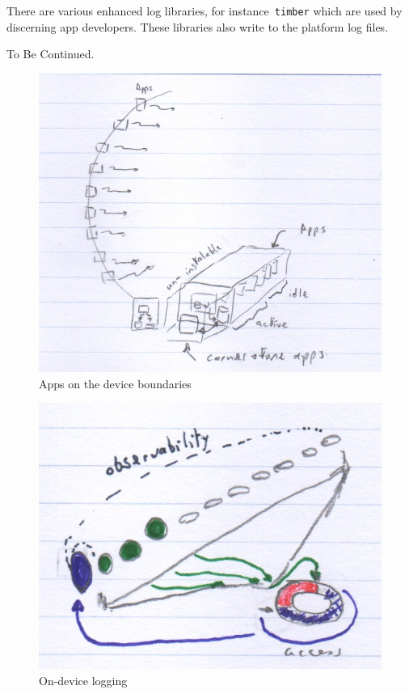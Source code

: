There are various enhanced log libraries, for instance~\texttt{timber} which are used by discerning app developers. These libraries also write to the platform log files. 

To Be Continued. %

\begin{figure}
    \includegraphics[width=\linewidth]{images/rough-sketches/apps-on-device-boundaries-sketch.jpeg}
    \caption{Apps on the device boundaries}
    \label{fig:apps-on-device-boundaries}
\end{figure}

\begin{figure}
    \includegraphics[width=\linewidth]{images/rough-sketches/on-device-logging-sketch.jpeg}
    \caption{On-device logging}
    \label{fig:on-device-logging}
\end{figure}

